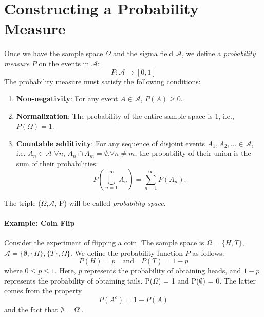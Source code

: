     \section{Constructing a Probability Measure}
    Once we have the sample space $\Omega$ and the sigma field $\mathcal{A}$, we define a \textit{probability measure} $P$ on the events in $\mathcal{A}$:
    \begin{equation}
        P: \mathcal{A} \rightarrow [0,1]
    \end{equation}
    The probability measure must satisfy the following conditions:
    \begin{enumerate}
        \item \textbf{Non-negativity}: For any event $A \in \mathcal{A}$, $P(A) \geq 0$.
        \item \textbf{Normalization}: The probability of the entire sample space is 1, i.e., $P(\Omega) = 1$.
        \item \textbf{Countable additivity}: For any sequence of disjoint events $A_1, A_2, \dots \in \mathcal{A}$, i.e. $A_n \in \mathcal{A}$ $\forall n$, $A_n \cap A_m = \emptyset$,$\forall n \neq m$, the probability of their union is the sum of their probabilities:
        \[
        P\left( \bigcup_{n=1}^{\infty} A_n \right) = \sum_{n=1}^{\infty} P(A_n).
        \]
    \end{enumerate}
    The triple ($\Omega$,$\mathcal{A}$, P) will be called \textit{probability space}.
    
    \paragraph{Example: Coin Flip}
    Consider the experiment of flipping a coin. The sample space is $\Omega = \{H, T\}$, $\mathcal{A} = \{ \emptyset, \{H\}, \{T\}, \Omega \}$.
    We define the probability function $P$ as follows:
    \[
    P(H) = p \quad \text{and} \quad P(T) = 1 - p
    \]
    where $0 \leq p \leq 1$. Here, $p$ represents the probability of obtaining heads, and $1 - p$ represents the probability of obtaining tails. P($\Omega$) = 1 and P($\emptyset$) = 0. The latter comes from the property
    \[
    P(A^c) = 1 - P(A)
    \]
    and the fact that $\emptyset = \Omega^c$.